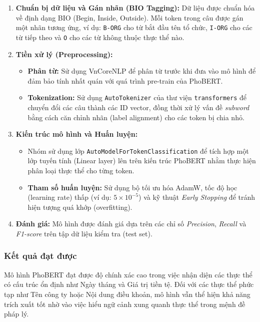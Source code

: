 \begin{enumerate}
    \item \textbf{Chuẩn bị dữ liệu và Gán nhãn (BIO Tagging):}
    Dữ liệu được chuẩn hóa về định dạng BIO (Begin, Inside, Outside). Mỗi token trong câu được gán một nhãn tương ứng, ví dụ: \texttt{B-ORG} cho từ bắt đầu tên tổ chức, \texttt{I-ORG} cho các từ tiếp theo và \texttt{O} cho các từ không thuộc thực thể nào.

    \item \textbf{Tiền xử lý (Preprocessing):}
    \begin{itemize}
        \item \textbf{Phân từ:} Sử dụng VnCoreNLP để phân từ trước khi đưa vào mô hình để đảm bảo tính nhất quán với quá trình pre-train của PhoBERT.
        \item \textbf{Tokenization:} Sử dụng \texttt{AutoTokenizer} của thư viện \texttt{transformers} để chuyển đổi các câu thành các ID vector, đồng thời xử lý vấn đề \textit{subword} bằng cách căn chỉnh nhãn (label alignment) cho các token bị chia nhỏ.
    \end{itemize}

    \item \textbf{Kiến trúc mô hình và Huấn luyện:}
    \begin{itemize}
        \item Nhóm sử dụng lớp \texttt{AutoModelForTokenClassification} để tích hợp một lớp tuyến tính (Linear layer) lên trên kiến trúc PhoBERT nhằm thực hiện phân loại thực thể cho từng token.
        \item \textbf{Tham số huấn luyện:} Sử dụng bộ tối ưu hóa AdamW, tốc độ học (learning rate) thấp (ví dụ: $5 \times 10^{-5}$) và kỹ thuật \textit{Early Stopping} để tránh hiện tượng quá khớp (overfitting).
    \end{itemize}

    \item \textbf{Đánh giá:}
    Mô hình được đánh giá dựa trên các chỉ số \textit{Precision}, \textit{Recall} và \textit{F1-score} trên tập dữ liệu kiểm tra (test set).
\end{enumerate}

\subsubsection{Kết quả đạt được}
Mô hình PhoBERT đạt được độ chính xác cao trong việc nhận diện các thực thể có cấu trúc ổn định như Ngày tháng và Giá trị tiền tệ. Đối với các thực thể phức tạp như Tên công ty hoặc Nội dung điều khoản, mô hình vẫn thể hiện khả năng trích xuất tốt nhờ vào việc hiểu ngữ cảnh xung quanh thực thể trong mệnh đề pháp lý.